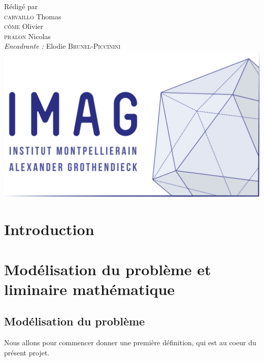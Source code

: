 \documentclass[frenchb]{report}
\newcommand{\1}{\mathbbm{1}}
\theoremstyle{definition}\newtheorem{defn}{Définition}
\theoremstyle{definition}\newtheorem{exm}{Exemple}
\theoremstyle{definition}\newtheorem{nota}{Notation}
\theoremstyle{definition}\newtheorem{rem}{Remarque}
\begin{document}
\begin{titlepage}
\begin{center}
{\large Rédigé par\\}
{\Large \textsc{carvaillo} Thomas}\\
{\Large \textsc{côme} Olivier}\\
{\Large \textsc{pralon} Nicolas}\\[1cm]
{\large \emph{Encadrante :} Elodie \textsc{Brunel-Piccinini}}\\[1.5cm] 

\includegraphics[scale=0.7]{imag_logo.png}

\end{center}
\end{titlepage}
\tableofcontents
\newpage

\chapter*{Introduction}


\pagebreak


\chapter{Modélisation du problème et liminaire mathématique}

\section{Modélisation du problème}

Nous allons pour commencer donner une première définition, qui est au coeur du présent projet.
\end{document}
